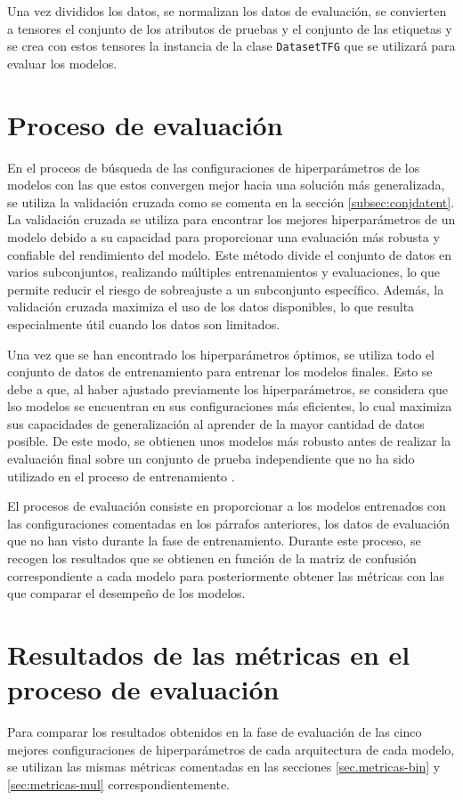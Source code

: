 Una vez divididos los datos, se normalizan los datos de evaluación, se convierten a tensores el conjunto de los atributos de pruebas y el conjunto de las etiquetas y se crea con estos tensores la instancia de la clase \texttt{DatasetTFG} que se utilizará para evaluar los modelos.

\section{Proceso de evaluación}
En el proceos de búsqueda de las configuraciones de hiperparámetros de los modelos con las que estos convergen mejor hacia una solución más generalizada, se utiliza la validación cruzada como se comenta en la sección \ref{subsec:conjdatent}. La validación cruzada se utiliza para encontrar los mejores hiperparámetros de un modelo debido a su capacidad para proporcionar una evaluación más robusta y confiable del rendimiento del modelo. Este método divide el conjunto de datos en varios subconjuntos, realizando múltiples entrenamientos y evaluaciones, lo que permite reducir el riesgo de sobreajuste a un subconjunto específico. Además, la validación cruzada maximiza el uso de los datos disponibles, lo que resulta especialmente útil cuando los datos son limitados. 

Una vez que se han encontrado los hiperparámetros óptimos, se utiliza todo el conjunto de datos de entrenamiento para entrenar los modelos finales. Esto se debe a que, al haber ajustado previamente los hiperparámetros, se considera que lso modelos se encuentran en sus configuraciones más eficientes, lo cual maximiza sus capacidades de generalización al aprender de la mayor cantidad de datos posible. De este modo, se obtienen unos modelos más robusto antes de realizar la evaluación final sobre un conjunto de prueba independiente que no ha sido utilizado en el proceso de entrenamiento \cite{hastie2009elements}.

El procesos de evaluación consiste en proporcionar a los modelos entrenados con las configuraciones comentadas en los párrafos anteriores, los datos de evaluación que no han visto durante la fase de entrenamiento. Durante este proceso, se recogen los resultados que se obtienen en función de la matriz de confusión correspondiente a cada modelo para posteriormente obtener las métricas con las que comparar el desempeño de los modelos.

\section{Resultados de las métricas en el proceso de evaluación}
Para comparar los resultados obtenidos en la fase de evaluación de las cinco mejores configuraciones de hiperparámetros de cada arquitectura de cada modelo, se utilizan las mismas métricas comentadas en las secciones \ref{sec.metricas-bin}  y \ref{sec:metricas-mul}  correspondientemente.

